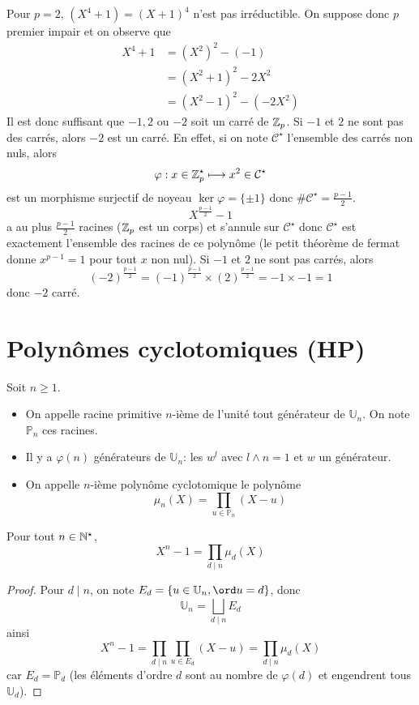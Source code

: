 Pour $p=2$, $(X^4+1)=(X+1)^4$ n'est pas irréductible. On suppose donc $p$ premier impair et on observe que \begin{align*}
    X^4+1&=(X^2)^2-(-1)\\&=(X^2+1)^2-2X^2\\&=(X^2-1)^2-(-2X^2)
\end{align*}
Il est donc suffisant que $-1, 2$ ou $-2$ soit un carré de $\mathbb Z_p$. Si $-1$ et $2$ ne sont pas des carrés, alors $-2$ est un carré. En effet, si on note $\mathcal C^\star$ l'ensemble des carrés non nuls, alors \[
    \varphi: x\in\mathbb Z_p^\star \longmapsto x^2\in\mathcal C^\star
\]
est un morphisme surjectif de noyeau $\ker \varphi=\{\pm1\}$ donc $\#\mathcal C^\star=\frac{p-1}2$. \[
    X^{\frac{p-1}2}-1
\]
a au plus $\frac{p-1}2$ racines ($\mathbb Z_p$ est un corps) et s'annule sur $\mathcal C^\star$ donc $\mathcal C^\star$ est exactement l'ensemble des racines de ce polynôme (le petit théorème de fermat donne $x^{p-1}=1$ pour tout $x$ non nul). Si $-1$ et $2$ ne sont pas carrés, alors \[
    (-2)^{\frac{p-1}2}=(-1)^{\frac{p-1}2}\times (2)^{\frac{p-1}2}=-1\times -1=1
\]
donc $-2$ carré.

\section{Polynômes cyclotomiques (HP)}


\begin{dfn}
Soit $n\geq 1$. \begin{itemize}
    \item On appelle racine primitive $n$-ième de l'unité tout générateur de $\mathbb U_n$. On note $\mathbb P_n$ ces racines.
    \item Il y a $\varphi(n)$ générateurs de $\mathbb U_n$: les $w^l$ avec $l\land n=1$ et $w$ un générateur.
    \item On appelle $n$-ième polynôme cyclotomique le polynôme \[
        \mu_n(X)=\prod_{u\in\mathbb P_n}(X-u)
    \]
\end{itemize}
\end{dfn}

\begin{prop}
Pour tout $n\in\mathbb N^\star$, \[
    X^n-1=\prod_{d\;|\;n}\mu_d(X)
\]
\end{prop}

\begin{proof}
Pour $d\;|\;n$, on note $E_d=\{u\in\mathbb U_n, \ord u=d\}$, donc \[
    \mathbb U_n =\bigsqcup_{d\;|\;n}E_d
\]
ainsi \[
    X^n-1=\prod_{d\;|\; n}\prod_{u\in E_d}(X-u)=\prod_{d\;|\;n}\mu_d(X)
\]
car $E_d=\mathbb P_d$ (les éléments d'ordre $d$ sont au nombre de $\varphi(d)$ et engendrent tous $\mathbb U_d$).
\end{proof}

